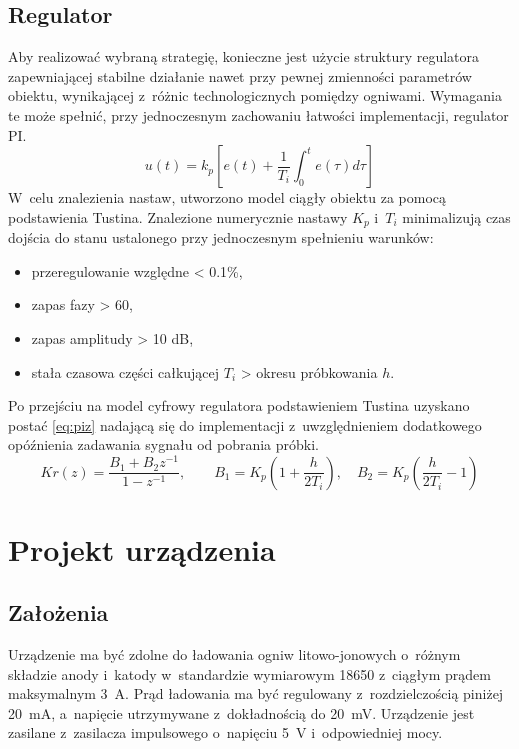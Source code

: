 \documentclass[polish,engineer]{polsl-msth}
\begin{document}
\section{Regulator}
Aby realizować wybraną strategię, konieczne jest użycie struktury regulatora zapewniającej stabilne działanie nawet przy pewnej zmienności parametrów obiektu, wynikającej z~różnic technologicznych pomiędzy ogniwami. Wymagania te może spełnić, przy jednoczesnym zachowaniu łatwości implementacji, regulator PI.
\begin{equation}
     u(t)=k_{p}\left[e(t)+{\frac {1}{T_{i}}}\int _{0}^{t}e(\tau )d\tau \right]
     \label{eq:PI_timebased}
\end{equation}
W~celu znalezienia nastaw, utworzono model ciągły obiektu za pomocą podstawienia Tustina. Znalezione numerycznie nastawy $K_p$ i~$T_i$ minimalizują czas dojścia do stanu ustalonego przy jednoczesnym spełnieniu warunków:
\begin{itemize}
    \item przeregulowanie względne < 0.1\%,
    \item zapas fazy > 60\degree,
    \item zapas amplitudy > 10 dB,
    \item stała czasowa części całkującej $T_i$ > okresu próbkowania $h$.
\end{itemize}
 Po przejściu na model cyfrowy regulatora podstawieniem Tustina uzyskano postać \ref{eq:piz} nadającą się do implementacji z~uwzględnieniem dodatkowego opóźnienia zadawania sygnału od pobrania próbki.
 \begin{equation}
Kr(z) = \frac{B_1+B_2 z^{-1}}{1 - z^{-1}}, \qquad
B_1 = K_p\left(1+\frac{h}{2T_i}\right), \quad B_2 = K_p\left(\frac{h}{2T_i}-1\right)
\label{eq:piz}
 \end{equation}

\chapter{Projekt urządzenia}
\section{Założenia}
Urządzenie ma być zdolne do ładowania ogniw litowo-jonowych o~różnym składzie anody i~katody w~standardzie wymiarowym 18650 z~ciągłym prądem maksymalnym 3~A. Prąd ładowania ma być regulowany z~rozdzielczością piniżej 20~mA, a~napięcie utrzymywane z~dokładnością do 20~mV. Urządzenie jest zasilane z~zasilacza impulsowego o~napięciu 5~V i~odpowiedniej mocy.
\end{document}
